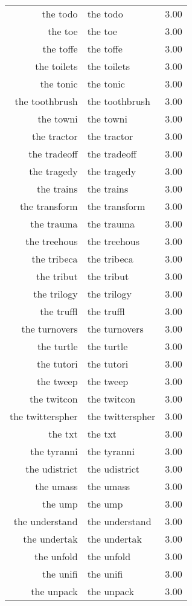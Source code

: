 \begin{table}[ht]
\begin{tabular}{rlr}
  the todo & the todo & 3.00 \\ 
  the toe & the toe & 3.00 \\ 
  the toffe & the toffe & 3.00 \\ 
  the toilets & the toilets & 3.00 \\ 
  the tonic & the tonic & 3.00 \\ 
  the toothbrush & the toothbrush & 3.00 \\ 
  the towni & the towni & 3.00 \\ 
  the tractor & the tractor & 3.00 \\ 
  the tradeoff & the tradeoff & 3.00 \\ 
  the tragedy & the tragedy & 3.00 \\ 
  the trains & the trains & 3.00 \\ 
  the transform & the transform & 3.00 \\ 
  the trauma & the trauma & 3.00 \\ 
  the treehous & the treehous & 3.00 \\ 
  the tribeca & the tribeca & 3.00 \\ 
  the tribut & the tribut & 3.00 \\ 
  the trilogy & the trilogy & 3.00 \\ 
  the truffl & the truffl & 3.00 \\ 
  the turnovers & the turnovers & 3.00 \\ 
  the turtle & the turtle & 3.00 \\ 
  the tutori & the tutori & 3.00 \\ 
  the tweep & the tweep & 3.00 \\ 
  the twitcon & the twitcon & 3.00 \\ 
  the twitterspher & the twitterspher & 3.00 \\ 
  the txt & the txt & 3.00 \\ 
  the tyranni & the tyranni & 3.00 \\ 
  the udistrict & the udistrict & 3.00 \\ 
  the umass & the umass & 3.00 \\ 
  the ump & the ump & 3.00 \\ 
  the understand & the understand & 3.00 \\ 
  the undertak & the undertak & 3.00 \\ 
  the unfold & the unfold & 3.00 \\ 
  the unifi & the unifi & 3.00 \\ 
  the unpack & the unpack & 3.00 \\ 

\end{tabular}
\end{table}
